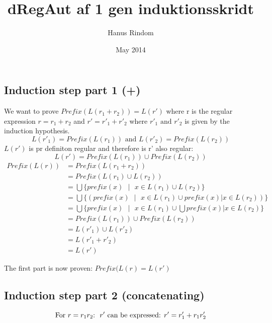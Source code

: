 \documentclass{article}
\title{dRegAut af 1 gen induktionsskridt}
\author{Hanus Rindom}
\date{May 2014}
\begin{document}
\maketitle

\subsection*{Induction step part 1 (+)}
    We want to prove $ Prefix(L(r_1+r_2))=L(r') $ where r is the regular expression $ r = r_1 + r_2 $ and $ r' = r'_1 + r'_2 $ where $ r'_1 \text{ and } r'_2 $ is given by the induction hypothesis.
    $$ L(r'_1)=Prefix(L(r_1)) \text{ and } L(r'_2)=Prefix(L(r_2)) $$
$ L(r') $ is pr definiton regular and therefore is r' also regular: 
    $$ L(r')=Prefix(L(r_1)) \cup Prefix(L(r_2)) $$
    \begin{equation*}
        \begin{split}
            Prefix(L(r)) &= Prefix(L(r_1 + r_2)) \\
            &= Prefix(L(r_1) \cup L(r_2)) \\
            &= \bigcup \{prefix(x) \text{ } | \text{ } x \in L(r_1) \cup L(r_2) \} \\
            &= \bigcup \{(prefix(x) \text{ } | \text{ } x \in L(r_1) \cup prefix(x) | x \in L(r_2)) \} \\
            &= \bigcup \{prefix(x) \text{ } | \text{ } x \in L(r_1) \cup \bigcup prefix(x) | x \in L(r_2) \} \\
            &= Prefix(L(r_1)) \cup Prefix(L(r_2))\\
            &= L(r'_1) \cup L(r'_2) \\
            &= L(r'_1 + r'_2) \\
            &= L(r')
        \end{split}
    \end{equation*}
        
The first part is now proven: $ Prefix(L(r)=L(r') $ 


\subsection*{Induction step part 2 (concatenating)}
        $$ \text{For } r=r_{1}r_2 \text{:\: } r' \text{ can be expressed: } r'=r'_1+r_{1}r'_2 $$
    
\end{document}
